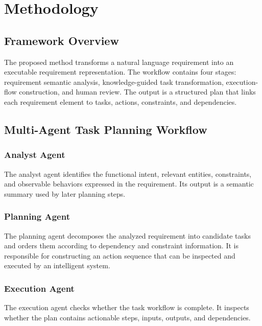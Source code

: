 \section{Methodology}
\label{methodology}

\subsection{Framework Overview}
\label{sec:method-overview}

The proposed method transforms a natural language requirement into an executable requirement representation.
The workflow contains four stages: requirement semantic analysis, knowledge-guided task transformation, execution-flow construction, and human review.
The output is a structured plan that links each requirement element to tasks, actions, constraints, and dependencies.

\subsection{Multi-Agent Task Planning Workflow}
\label{sec:method-agents}

\subsubsection{Analyst Agent}
\label{sec:method-analyst}

The analyst agent identifies the functional intent, relevant entities, constraints, and observable behaviors expressed in the requirement.
Its output is a semantic summary used by later planning steps.

\subsubsection{Planning Agent}
\label{sec:method-planning-agent}

The planning agent decomposes the analyzed requirement into candidate tasks and orders them according to dependency and constraint information.
It is responsible for constructing an action sequence that can be inspected and executed by an intelligent system.

\subsubsection{Execution Agent}
\label{sec:method-execution-agent}

The execution agent checks whether the task workflow is complete.
It inspects whether the plan contains actionable steps, inputs, outputs, and dependencies.

